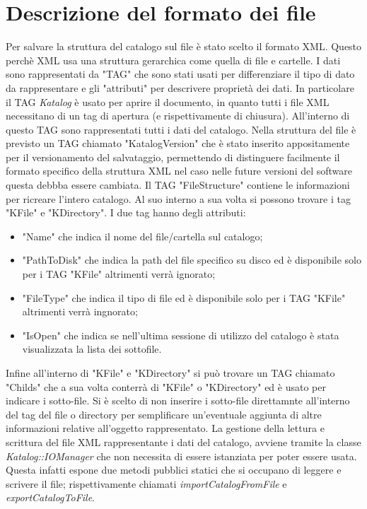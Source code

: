 \section{Descrizione del formato dei file}

Per salvare la struttura del catalogo sul file è stato scelto il formato XML.
Questo perchè XML usa una struttura gerarchica come quella di file e cartelle. 
I dati sono rappresentati da "TAG" che sono stati usati per differenziare 
il tipo di dato da rappresentare e gli "attributi" per descrivere proprietà dei dati.
In particolare il TAG \emph{Katalog} è usato per aprire il documento, in quanto tutti i file XML necessitano di un tag di apertura (e rispettivamente di chiusura).
All'interno di questo TAG sono rappresentati tutti i dati del catalogo. 
Nella struttura del file è previsto un TAG chiamato "KatalogVersion" che è stato inserito appositamente 
per il versionamento del salvataggio, permettendo di distinguere facilmente il formato specifico 
della struttura XML nel caso nelle future versioni del software questa debbba essere cambiata. 
Il TAG "FileStructure" contiene le informazioni per ricreare l'intero catalogo. Al suo interno a sua volta si possono 
trovare i tag "KFile" e "KDirectory". I due tag hanno degli attributi:
\begin{itemize}
    \item "Name" che indica il nome del file/cartella sul catalogo;
    \item "PathToDisk" che indica la path del file specifico su disco ed è disponibile solo per i TAG "KFile" altrimenti verrà ignorato;
    \item "FileType" che indica il tipo di file ed è disponibile solo per i TAG "KFile" altrimenti verrà ingnorato;
    \item "IsOpen" che indica se nell'ultima sessione di utilizzo del catalogo è stata visualizzata la lista dei sottofile.
\end{itemize}
Infine all'interno di "KFile" e "KDirectory" si può trovare un TAG chiamato "Childs" che a sua volta conterrà di "KFile" o "KDirectory" ed è usato per 
indicare i sotto-file. Si è scelto di non inserire i sotto-file direttamnte all'interno del tag
del file o directory per semplificare un'eventuale aggiunta di altre informazioni relative all'oggetto rappresentato. 
La gestione della lettura e scrittura del file XML rappresentante i dati del catalogo, avviene tramite la classe \emph{Katalog::IOManager} che non necessita di essere istanziata per 
poter essere usata. Questa infatti espone due metodi pubblici statici che si occupano di leggere e scrivere il file; rispettivamente chiamati \emph{importCatalogFromFile} e \emph{exportCatalogToFile}.
